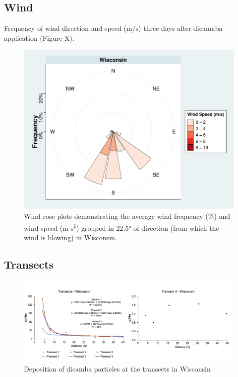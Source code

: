 \documentclass[]{article}
\begin{document}
\pagebreak
\newpage

\subsection{Wind}\label{wind-5}

Frequency of wind direction and speed (m/s) three days after dicamaba
application (Figure X).

\begin{figure}
\centering
\includegraphics{Report_Dicamba_study_files/figure-latex/unnamed-chunk-91-1.pdf}
\caption{Wind rose plots demonstrating the average wind frequency (\%)
and wind speed (m s\textsuperscript{1}) grouped in 22.5° of direction
(from which the wind is blowing) in Wisconsin.}
\end{figure}

\pagebreak
\newpage

\subsection{Transects}\label{transects-5}

\begin{figure}[h]

{\centering \includegraphics[width=1\linewidth]{Wisctransect} 

}

\caption{Deposition of dicamba particles at the transects in Wisconsin}\label{fig:unnamed-chunk-92}
\end{figure}
\end{document}
